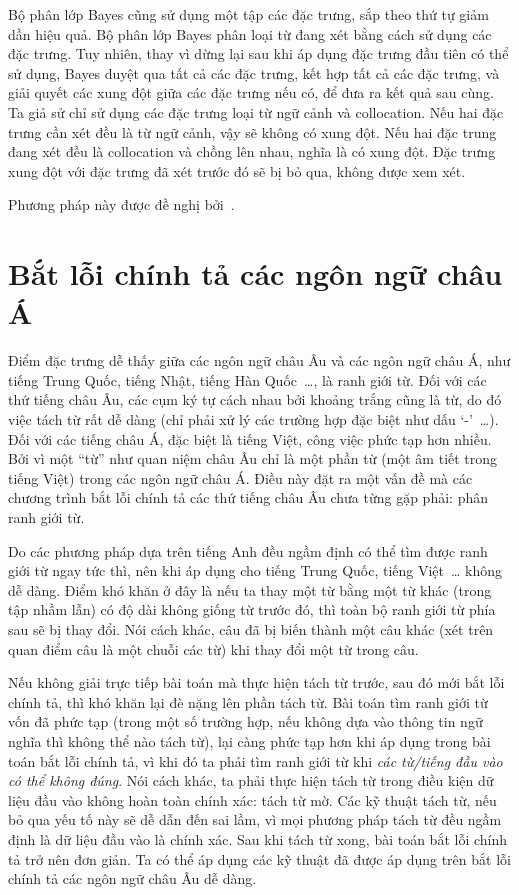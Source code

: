 \documentclass[a4paper,oneside,14pt]{extbook} %
\begin{document}
Bộ phân lớp Bayes cũng sử
dụng một tập các đặc trưng, sắp theo thứ tự giảm dần hiệu quả. Bộ phân
lớp Bayes phân loại từ đang xét bằng cách sử dụng các đặc trưng. Tuy
nhiên, thay vì dừng lại sau khi áp dụng đặc trưng đầu tiên có thể sử
dụng, Bayes duyệt qua tất cả các đặc trưng, kết hợp tất cả các đặc
trưng, và giải quyết các xung đột giữa các đặc trưng nếu có, để đưa ra
kết quả sau cùng. Ta giả sử chỉ sử dụng các đặc trưng loại từ ngữ cảnh
và collocation. Nếu hai đặc trưng cần xét đều là từ ngữ cảnh,
 vậy sẽ không có xung đột. Nếu hai đặc trung đang xét đều
là collocation và chồng lên nhau, nghĩa là có xung đột. Đặc trưng xung
đột với đặc trưng đã xét trước đó sẽ bị bỏ qua, không được xem
xét.

Phương pháp này được đề nghị bởi~\cite{Golding95}.

\section{Bắt lỗi chính tả các ngôn ngữ châu Á}


Điểm đặc trưng dễ thấy giữa các ngôn ngữ châu Âu và các ngôn ngữ châu
Á, như tiếng Trung Quốc, tiếng Nhật, tiếng Hàn Quốc~\ldots{}, là ranh
giới từ. Đối với các thứ tiếng châu Âu, các cụm ký tự cách nhau bởi
khoảng trắng cũng là từ, do đó việc tách từ rất dễ dàng (chỉ phải
xử lý các trường hợp đặc biệt như dấu `-'~\ldots{}). Đối với các tiếng
châu Á, đặc biệt là tiếng Việt, công việc phức tạp hơn nhiều. Bởi vì
một ``từ'' như quan niệm châu Âu chỉ là một phần từ (một âm tiết trong
tiếng Việt) trong các ngôn ngữ châu Á. Điều này đặt ra một vấn đề mà
các chương trình bắt lỗi chính tả các thứ tiếng châu Âu chưa từng gặp
phải: phân ranh giới từ. 

Do các phương pháp dựa trên tiếng Anh đều ngầm định có thể tìm được
ranh giới từ ngay tức thì, nên khi áp dụng cho tiếng Trung Quốc,
tiếng Việt~\ldots{}{} không dễ dàng. Điểm khó khăn ở đây là nếu ta thay
một từ bằng một từ khác (trong tập nhầm lẫn) có độ dài không giống từ
trước đó, thì toàn bộ ranh giới từ phía sau sẽ bị thay đổi. Nói cách
khác, câu đã bị biến thành một câu khác (xét trên quan điểm câu là một
chuỗi các từ) khi thay đổi một từ trong câu.

Nếu không giải trực tiếp bài toán mà thực hiện tách từ trước, sau đó
mới bắt lỗi chính tả, thì khó khăn lại đè nặng lên phần tách từ.
Bài toán tìm ranh giới từ vốn đã phức tạp
(trong một số trường hợp, nếu không dựa vào thông tin ngữ nghĩa thì
không thể nào tách từ), lại càng phức tạp hơn khi áp dụng trong bài
toán bắt lỗi chính tả, vì khi đó ta phải tìm ranh giới từ khi {\em các
từ/tiếng đầu vào có thể không đúng}. Nói cách khác, ta phải thực hiện
tách từ trong điều kiện dữ liệu đầu vào không hoàn toàn chính xác:
tách từ mờ. Các kỹ thuật tách từ, nếu bỏ qua
yếu tố này sẽ dễ dẫn đến sai lầm, vì mọi phương pháp tách từ đều ngầm
định là dữ liệu đầu vào là chính xác. Sau khi tách từ xong, bài toán bắt
lỗi chính tả trở nên đơn giản. Ta có thể áp dụng các kỹ thuật đã được
áp dụng trên bắt lỗi chính tả các ngôn ngữ châu Âu dễ dàng.
\end{document}
